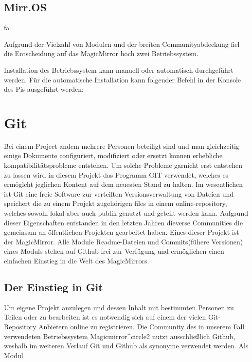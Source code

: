 \documentclass[12pt,a4paper]{report}
\begin{document}
\subsection*{Mirr.OS}
fa


Aufgrund der Vielzahl von Modulen und der breiten Communityabdeckung fiel die Entscheidung auf das MagicMirror hoch zwei Betriebssystem. 


Installation des Betriebssystem kann manuell oder automatisch durchgeführt werden. 
Für die automatische Installation kann folgender Befehl in der Konsole des Pis ausgeführt werden:

\section{Git}
Bei einem Project andem mehrere Personen beteiligt sind und man gleichzeitig einige Dokumente configuriert, modifiziert oder ersetzt können erhebliche kompatibilitätsprobleme entstehen. Um solche Probleme garnicht erst entstehen zu lassen wird in diesem Projekt das Programm GIT verwendet, welches es ermöglcht jeglichen Kontent auf dem neuesten Stand zu halten. Im wesentlichen ist Git eine freie Software zur verteilten Versionsverwaltung von Dateien und speichert die zu einem Projekt zugehörigen files in einem online-repository, welches sowohl lokal aber auch publik genutzt und geteilt werden kann. Aufgrund dieser Eigenschaften entstanden in den letzten Jahren dieverse Communities die gemeinsam an öffentlichen Projekten gearbeitet haben. Eines dieser Projekt ist der MagicMirror. Alle Module Readme-Dateien und Commits(fühere Versionen) eines Moduls stehen auf Github frei zur Verfügung und ermöglichen einen einfachen Einstieg in die Welt des MagicMirrors.

\subsection*{Der Einstieg in Git}
Um eigene Projekt anzulegen und dessen Inhalt mit bestimmten Personen zu Teilen oder zu bearbeiten ist es notwendig sich auf einem der vielen Git-Repository Anbietern online zu registrieren. Die Community des in unserem Fall verwendeten Betriebssystem Magicmirror^circle{2} nutzt ausschließlich Github, weshalb im weiteren Verlauf Git und Github als synonyme verwendet werden. 
Als Modul
\end{document}
